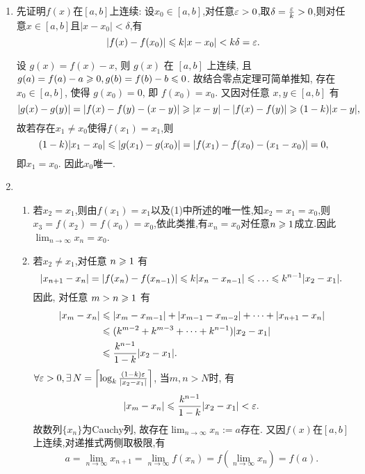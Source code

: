 \begin{solution}
    \begin{enumerate}
        \item 先证明$f(x)$在$[a,b]$上连续:
              设$x_0 \in [a,b]$,对任意$\varepsilon > 0$,取$\delta = \frac{\varepsilon}{k} > 0$,则对任意$x \in [a,b]$且$|x-x_0| < \delta$,有
              $$|f(x)-f(x_0)| \leqslant k|x-x_0| < k\delta = \varepsilon.$$

              设 $g(x) = f(x) - x$, 则 $g(x)$ 在 $[a,b]$ 上连续, 且 $g(a) = f(a) - a \geqslant 0, g(b) = f(b) - b \leqslant 0$. 故结合零点定理可简单推知, 存在 $x_0 \in [a,b]$, 使得 $g(x_0) = 0$, 即 $f(x_0) = x_0$. 又因对任意 $x,y \in [a,b]$ 有
              $$|g(x)-g(y)| = |f(x)-f(y)-(x-y)| \geqslant |x-y| - |f(x)-f(y)| \geqslant (1-k)|x-y|,$$
              故若存在$x_1 \ne x_0$使得$f(x_1) = x_1$,则
              $$(1-k)|x_1-x_0| \leqslant |g(x_1)-g(x_0)| = |f(x_1)-f(x_0)-(x_1-x_0)| = 0,$$
              即$x_1 = x_0$. 因此$x_0$唯一.
        \item \begin{enumerate}
                  \item 若$x_2 = x_1$,则由$f(x_1) = x_1$以及(1)中所述的唯一性,知$x_2 = x_1 = x_0$,则$x_3 = f(x_2) = f(x_0) = x_0$,依此类推,有$x_n = x_0$对任意$n \geqslant 1$成立.因此$\lim_{n \to \infty} x_n = x_0$.
                  \item 若$x_2 \ne x_1$,对任意 $n \geqslant 1$ 有
                        $$|x_{n+1} - x_n| = |f(x_n) - f(x_{n-1})| \les k|x_n - x_{n-1}| \les \dots \les k^{n-1}|x_2 - x_1|.$$
                        因此, 对任意 $m > n \geqslant 1$ 有
                        \begin{align*}
                            |x_m - x_n| & \leqslant |x_m - x_{m-1}| + |x_{m-1} - x_{m-2}| + \dots + |x_{n+1} - x_n| \\
                                        & \leqslant (k^{m-2} + k^{m-3} + \dots + k^{n-1})|x_2 - x_1|                \\
                                        & \leqslant \frac{k^{n-1}}{1-k}|x_2 - x_1|.
                        \end{align*}
                        $\forall \ve > 0, \exists N = \left\lceil \log_k \frac{(1-k)\ve}{|x_2 - x_1|} \right\rceil$, 当$m,n > N$时, 有
                        $$|x_m - x_n| \leqslant \frac{k^{n-1}}{1-k}|x_2 - x_1| < \varepsilon.$$
                        故数列$\{x_n\}$为Cauchy列, 故存在$\lim_{n \to \infty} x_n:=a$存在. 又因$f(x)$在$[a,b]$上连续,对递推式两侧取极限,有
                        $$a = \lim_{n \to \infty} x_{n+1} = \lim_{n \to \infty} f(x_n) = f\left( \lim_{n \to \infty} x_n \right) = f(a).$$

\end{enumerate}
\end{enumerate}
\end{solution}
